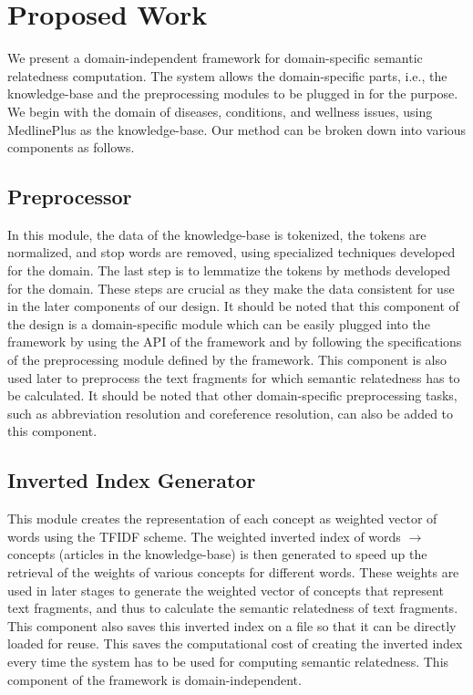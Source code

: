 \documentclass[conference]{IEEEtran}
\begin{document}
\section{Proposed Work}

We present a domain-independent framework for domain-specific semantic relatedness computation. The system allows the domain-specific parts, i.e., the knowledge-base and the preprocessing modules to be plugged in for the purpose. We begin with the domain of diseases, conditions, and wellness issues, using MedlinePlus as the knowledge-base.
Our method can be broken down into various components as follows.

\subsection{Preprocessor}

In this module, the data of the knowledge-base is tokenized, the tokens are normalized, and stop words are removed, using specialized techniques developed for the domain. The last step is to lemmatize the tokens by methods developed for the domain. These steps are crucial as they make the data consistent for use in the later components of our design. It should be noted that this component of the design is a domain-specific module which can be easily plugged into the framework by using the API of the framework and by following the specifications of the preprocessing module defined by the framework. This component is also used later to preprocess the text fragments for which semantic relatedness has to be calculated. It should be noted that other domain-specific preprocessing tasks, such as abbreviation resolution and coreference resolution, can also be added to this component.

\subsection{Inverted Index Generator}

This module creates the representation of each concept as weighted vector of words using the TFIDF scheme. The weighted inverted index of words $\rightarrow$ concepts (articles in the knowledge-base) is then generated to speed up the retrieval of the weights of various concepts for different words. These weights are used in later stages to generate the weighted vector of concepts that represent text fragments, and thus to calculate the semantic relatedness of text fragments. This component also saves this inverted index on a file so that it can be directly loaded for reuse. This saves the computational cost of creating the inverted index every time the system has to be used for computing semantic relatedness. This component of the framework is domain-independent.
\end{document}
